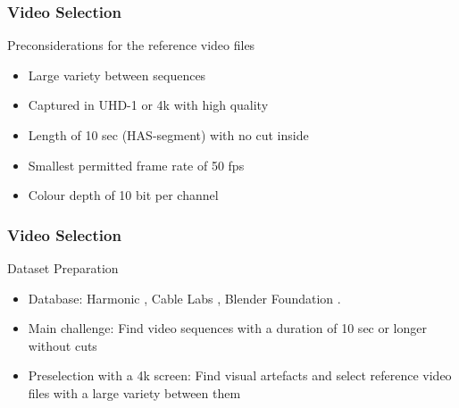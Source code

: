 \begin{frame}
\frametitle{Video Selection}

\large{Preconsiderations for the reference video files}
\begin{itemize}
	
\item Large variety between sequences
\item Captured in UHD-1 or 4k with high quality
\item Length of 10 sec (HAS-segment) with no cut inside
\item Smallest permitted frame rate of 50 fps
\item Colour depth of 10 bit per channel

\end{itemize}

\end{frame}


\begin{frame}
\frametitle{Video Selection}
\large{Dataset Preparation}

\begin{itemize}

\item Database:
\newline Harmonic \cite{web:harmonic}, Cable Labs \cite{web:cablelabs}, Blender Foundation \cite{web:bbb}.	
\item Main challenge: 
\newline Find video sequences with a duration of 10 sec or longer without cuts
\item Preselection with a 4k screen:
\newline Find visual artefacts and select reference video files with a large variety between them

\end{itemize}
\end{frame}


